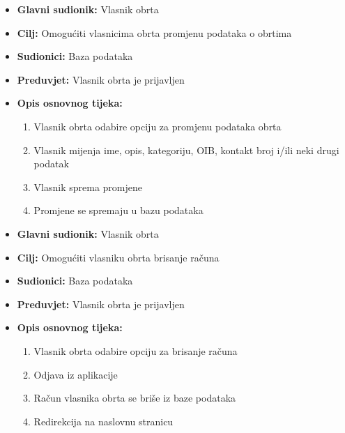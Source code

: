 			\noindent{}
				\begin{itemize}
					\item \textbf{Glavni sudionik: } Vlasnik obrta 
					\item \textbf{Cilj: }Omogućiti vlasnicima obrta promjenu podataka o obrtima
					\item \textbf{Sudionici: } Baza podataka 
					\item \textbf{Preduvjet: } Vlasnik obrta je prijavljen
					\item \textbf{Opis osnovnog tijeka: }
					\begin{enumerate}
						\item Vlasnik obrta odabire opciju za promjenu podataka obrta
						\item Vlasnik mijenja ime, opis, kategoriju, OIB, kontakt broj i/ili neki drugi podatak
						\item Vlasnik sprema promjene
						\item Promjene se spremaju u bazu podataka
					\end{enumerate}
				\end{itemize}
					
			\noindent{}
				\begin{itemize}
					\item \textbf{Glavni sudionik: } Vlasnik obrta 
					\item \textbf{Cilj: }Omogućiti vlasniku obrta brisanje računa
					\item \textbf{Sudionici: } Baza podataka 
					\item \textbf{Preduvjet: } Vlasnik obrta je prijavljen
					\item \textbf{Opis osnovnog tijeka: }
					\begin{enumerate}
						\item Vlasnik obrta odabire opciju za brisanje računa
						\item Odjava iz aplikacije
						\item Račun vlasnika obrta se briše iz baze podataka
                        \item Redirekcija na naslovnu stranicu
					\end{enumerate}
				\end{itemize}
					
